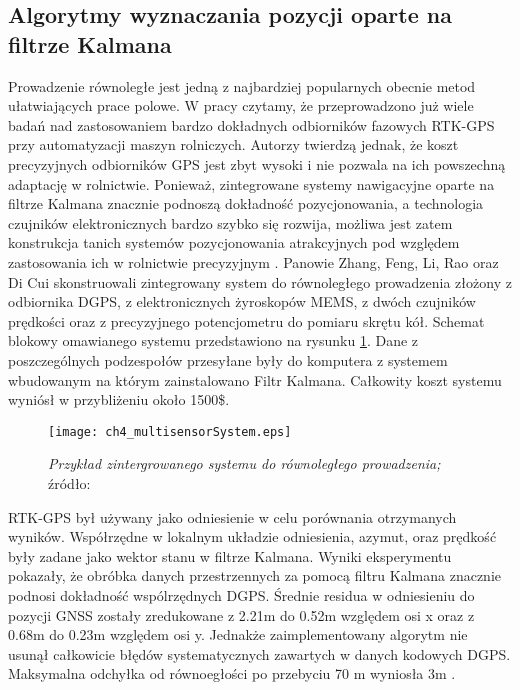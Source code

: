 \subsection{Algorytmy wyznaczania pozycji oparte na filtrze Kalmana}
Prowadzenie równoległe jest jedną z najbardziej popularnych obecnie metod ułatwiających prace polowe.
W pracy \cite{CCTA5_461_469} czytamy, że przeprowadzono już wiele badań nad zastosowaniem bardzo dokładnych odbiorników fazowych RTK-GPS
przy automatyzacji maszyn rolniczych. Autorzy twierdzą jednak, że koszt precyzyjnych odbiorników GPS jest zbyt wysoki
i nie pozwala na ich powszechną adaptację w rolnictwie. Ponieważ, zintegrowane systemy nawigacyjne oparte na filtrze Kalmana
znacznie podnoszą dokładność pozycjonowania, a technologia czujników elektronicznych bardzo szybko się rozwija,
możliwa jest zatem konstrukcja tanich systemów pozycjonowania atrakcyjnych pod względem zastosowania ich w rolnictwie precyzyjnym \cite{CCTA5_461_469}.
Panowie Zhang, Feng, Li, Rao oraz Di Cui skonstruowali zintegrowany system do równoległego prowadzenia złożony z odbiornika DGPS,
z elektronicznych żyroskopów MEMS, z dwóch czujników prędkości oraz z precyzyjnego potencjometru do pomiaru skrętu kół.
Schemat blokowy omawianego systemu przedstawiono na rysunku \ref{fig:ch4_multisensorSystem}.
Dane z poszczególnych podzespołów przesyłane były do komputera z systemem wbudowanym na którym zainstalowano Filtr Kalmana.
Całkowity koszt systemu wyniósł w przybliżeniu około 1500\$.
\begin{figure}[H]
\centering
\texttt{[image: ch4\_multisensorSystem.eps]}
\caption{\textit{Przykład zintergrowanego systemu do równoległego prowadzenia;}\newline
źródło: \cite[][strona 464]{CCTA5_461_469}}
\label{fig:ch4_multisensorSystem}
\end{figure}   
RTK-GPS był używany jako odniesienie w celu porównania otrzymanych wyników. 
Współrzędne w lokalnym układzie odniesienia, azymut, oraz prędkość były zadane jako wektor stanu w filtrze Kalmana.
Wyniki eksperymentu pokazały, że obróbka danych przestrzennych za pomocą filtru Kalmana znacznie podnosi dokładność wspólrzędnych DGPS.
Średnie residua w odniesieniu do pozycji GNSS zostały zredukowane z 2.21m do 0.52m względem osi x oraz z 0.68m do 0.23m względem osi y.
Jednakże zaimplementowany algorytm nie usunął całkowicie błędów systematycznych zawartych w danych kodowych DGPS.
Maksymalna odchyłka od równoegłości po przebyciu 70 m wyniosła 3m \cite{CCTA5_461_469}.

